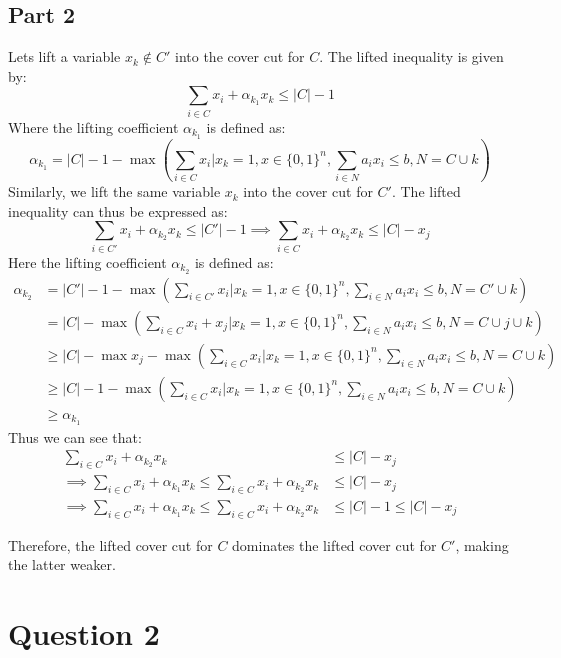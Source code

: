 \documentclass{article}
\begin{document}
    \subsection*{Part 2}
    Lets lift a variable $x_k\notin C'$ into the cover cut for $C$. The lifted inequality is given by:
    \[
        \sum_{i \in C} x_i + \alpha_{k_1} x_k \leq |C| - 1
    \]
    Where the lifting coefficient $\alpha_{k_1}$ is defined as:
    \[
        \alpha_{k_1} = |C| - 1 - \max \left(\sum_{i \in C} x_i | x_k = 1, x \in \{0,1\}^n, \sum_{i \in N} a_i x_i \leq b, N=C\cup{k}\right)
    \]
    Similarly, we lift the same variable $x_k$ into the cover cut for $C'$. The lifted inequality can thus be expressed as:
    \[
        \sum_{i \in C'} x_i + \alpha_{k_2} x_k \leq |C'| - 1  \implies \sum_{i \in C} x_i + \alpha_{k_2} x_k \leq |C| - x_j
    \]
    Here the lifting coefficient $\alpha_{k_2}$ is defined as:
    \begin{align*}
        \alpha_{k_2} &= |C'| - 1 - \max \left(\sum_{i \in C'} x_i | x_k = 1, x \in \{0,1\}^n, \sum_{i \in N} a_i x_i \leq b, N=C'\cup{k}\right) \\
        &= |C| -  \max \left(\sum_{i \in C} x_i + x_j | x_k = 1, x \in \{0,1\}^n, \sum_{i \in N} a_i x_i \leq b, N=C\cup{j}\cup{k}\right)\\
        &\geq |C| - \max{x_j} - \max \left(\sum_{i \in C} x_i | x_k = 1, x \in \{0,1\}^n, \sum_{i \in N} a_i x_i \leq b, N=C\cup{k}\right) \\
        &\geq |C| - 1 - \max \left(\sum_{i \in C} x_i | x_k = 1, x \in \{0,1\}^n, \sum_{i \in N} a_i x_i \leq b, N=C\cup{k}\right) \\
        &\geq \alpha_{k_1}
    \end{align*}
    Thus we can see that:
    \begin{align*}
        \sum_{i \in C} x_i + \alpha_{k_2} x_k &\leq |C| - x_j \\
        \implies \sum_{i \in C} x_i + \alpha_{k_1} x_k \leq \sum_{i \in C} x_i + \alpha_{k_2} x_k &\leq |C| - x_j\\
        \implies \sum_{i \in C} x_i + \alpha_{k_1} x_k \leq \sum_{i \in C} x_i + \alpha_{k_2} x_k &\leq |C| - 1 \leq |C| - x_j
    \end{align*}
    
    Therefore, the lifted cover cut for $C$ dominates the lifted cover cut for $C'$, making the latter weaker.
    
\section*{Question 2}
\end{document}
